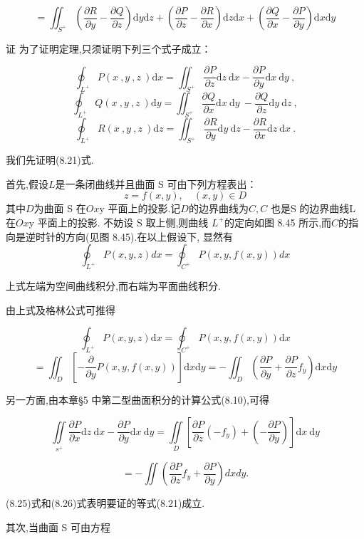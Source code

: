 \documentclass{article}
\begin{document}
$$=\iint_{S^+}\left(\frac{\partial R}{\partial y}-\frac{\partial Q}{\partial z}\right)\mathrm{d}y\mathrm{d}z+\left(\frac{\partial P}{\partial z}-\frac{\partial R}{\partial x}\right)\mathrm{d}z\mathrm{d}x+\left(\frac{\partial Q}{\partial x}-\frac{\partial P}{\partial y}\right)\mathrm{d}x\mathrm{d}y$$

证 为了证明定理,只须证明下列三个式子成立：

$$\oint_{L^+}P\left(x\:,y\:,z\:\right)\mathrm{d}x=\iint_{S^+}\frac{\partial P}{\partial z}\mathrm{d}z\:\mathrm{d}x-\frac{\partial P}{\partial y}\mathrm{d}x\:\mathrm{d}y\:,$$
$$\oint_{L^+}Q\left(x\:,y\:,z\:\right)\mathrm{d}y=\iint_{S^+}\frac{\partial Q}{\partial x}\mathrm{d}x\:\mathrm{d}y\:-\frac{\partial Q}{\partial z}\mathrm{d}y\:\mathrm{d}z\:,$$
$$\oint_{L^+}R\left(x\:,y\:,z\:\right)\mathrm{d}z=\iint_{S^+}\frac{\partial R}{\partial y}\mathrm{d}y\:\mathrm{d}z-\frac{\partial R}{\partial x}\mathrm{d}z\:\mathrm{d}x\:.$$

我们先证明(8.21)式.

首先,假设$L$是一条闭曲线并且曲面 S 可由下列方程表出：
$$z=f\left(x,y\right),\quad(x,y)\in D$$
其中$D$为曲面 S 在$Ox$y 平面上的投影.记$D$的边界曲线为$C,C$ 也是S 的边界曲线L 在$Ox$y 平面上的投影.
不妨设 S 取上侧,则曲线 $L^+$的定向如图 8.45 所示,而$C$的指向是逆时针的方向(见图 8.45).在以上假设下,
显然有
$$\oint_{L^+}P(x,y,z)dx=\oint_{C^+}P(x,y,f(x,y))dx$$ 

上式左端为空间曲线积分,而右端为平面曲线积分.

由上式及格林公式可推得

$$\oint_{L^+}P\left(x,y,z\right)\mathrm{d}x=\oint_{C^+}P\left(x,y,f\left(x,y\right)\right)\mathrm{d}x$$
$$=\iint_D\left[-\frac{\partial}{\partial y}P\left(x,y,f\left(x,y\right)\right)\right]\mathrm{d}x\mathrm{d}y=-\iint_D\left(\frac{\partial P}{\partial y}+\frac{\partial P}{\partial z}f_y\right)\mathrm{d}x\mathrm{d}y$$

另一方面,由本章§5 中第二型曲面积分的计算公式(8.10),可得

$$\iint\limits_{s^+}\frac{\partial P}{\partial x}\mathrm{d}z\:\mathrm{d}x-\frac{\partial P}{\partial y}\mathrm{d}x\:\mathrm{d}y=\iint\limits_D\left[\frac{\partial P}{\partial z}(-f_y)+\left(-\frac{\partial P}{\partial y}\right)\right]\mathrm{d}x\:\mathrm{d}y$$

$$= - \iint \left ( \frac {\partial P}{\partial z}f_{y}+ \frac {\partial P}{\partial y}\right ) dxdy.$$

(8.25)式和(8.26)式表明要证的等式(8.21)成立.

其次,当曲面 S 可由方程
\end{document}
